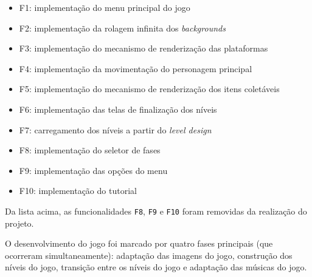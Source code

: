   \begin{itemize}
    \item F1: implementação do menu principal do jogo
    \item F2: implementação da rolagem infinita dos \textit{backgrounds}
    \item F3: implementação do mecanismo de renderização das plataformas
    \item F4: implementação da movimentação do personagem principal
    \item F5: implementação do mecanismo de renderização dos itens coletáveis
    \item F6: implementação das telas de finalização dos níveis
    \item F7: carregamento dos níveis a partir do \textit{level design}
    \item F8: implementação do seletor de fases
    \item F9: implementação das opções do menu
    \item F10: implementação do tutorial
  \end{itemize}

  Da lista acima, as funcionalidades \texttt{F8}, \texttt{F9} e \texttt{F10} foram removidas da realização do projeto.

  O desenvolvimento do jogo foi marcado por quatro fases principais (que ocorreram simultaneamente): adaptação das imagens do jogo, construção dos níveis do jogo, transição entre os níveis do jogo e adaptação das músicas do jogo.

  

  

  

  

  
